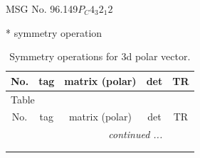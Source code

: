 \documentclass[fleqn,8pt]{jsarticle}
\begin{document}
\setcounter{MaxMatrixCols}{32}

\renewcommand{\tablename}{Table~}
\renewcommand{\figurename}{Figure~}
\begin{center}
\LARGE
MSG No. 96.149\quad$P_{C}4_{3}2_{1}2$
\end{center}
* symmetry operation
\renewcommand{\arraystretch}{1.3}
\begin{longtable}{ccccc}
\caption{Symmetry operations for 3d polar vector.}
 \\
 \hline \hline
No. & tag & matrix (polar) & det & TR \\ \hline \endfirsthead

\multicolumn{4}{l}{\tablename\ \thetable{}} \\
 \hline \hline
No. & tag & matrix (polar) & det & TR \\ \hline \endhead

 \hline \hline
\multicolumn{4}{r}{\footnotesize\it continued ...} \\ \endfoot

 \hline \hline
\multicolumn{4}{r}{} \\ \endlastfoot


\end{longtable}
\end{document}

